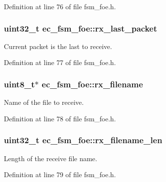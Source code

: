 \-Definition at line 76 of file fsm\-\_\-foe.\-h.

\subsubsection[{rx\-\_\-last\-\_\-packet}]{\setlength{\rightskip}{0pt plus 5cm}uint32\-\_\-t {\bf ec\-\_\-fsm\-\_\-foe\-::rx\-\_\-last\-\_\-packet}}\label{structec__fsm__foe_a1851f47e360be36fa979e219f36da5d0}


\-Current packet is the last to receive. 



\-Definition at line 77 of file fsm\-\_\-foe.\-h.

\subsubsection[{rx\-\_\-filename}]{\setlength{\rightskip}{0pt plus 5cm}uint8\-\_\-t$\ast$ {\bf ec\-\_\-fsm\-\_\-foe\-::rx\-\_\-filename}}\label{structec__fsm__foe_af0315313d092bab948ce47c2114dc870}


\-Name of the file to receive. 



\-Definition at line 78 of file fsm\-\_\-foe.\-h.

\subsubsection[{rx\-\_\-filename\-\_\-len}]{\setlength{\rightskip}{0pt plus 5cm}uint32\-\_\-t {\bf ec\-\_\-fsm\-\_\-foe\-::rx\-\_\-filename\-\_\-len}}\label{structec__fsm__foe_ab355fc6657db6b9c8c63fee2ec3a4e91}


\-Length of the receive file name. 



\-Definition at line 79 of file fsm\-\_\-foe.\-h.


